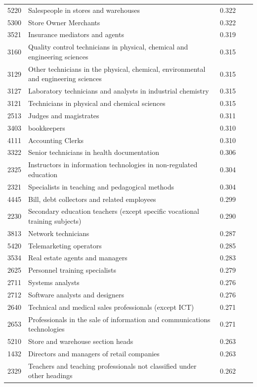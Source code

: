 \begin{longtable}{p{}>{\raggedright\arraybackslash}p{}rrr}
5220 & Salespeople in stores and warehouses & 0.322 & & \\
5300 & Store Owner Merchants & 0.322 & & \\
3521 & Insurance mediators and agents & 0.319 & & \\
3160 & Quality control technicians in physical, chemical and engineering sciences & 0.315 & & \\
3129 & Other technicians in the physical, chemical, environmental and engineering sciences & 0.315 & & \\
3127 & Laboratory technicians and analysts in industrial chemistry & 0.315 & & \\
3121 & Technicians in physical and chemical sciences & 0.315 & & \\
2513 & Judges and magistrates & 0.311 & & \\
3403 & bookkeepers & 0.310 & & \\
4111 & Accounting Clerks & 0.310 & & \\
3322 & Senior technicians in health documentation & 0.306 & & \\
2325 & Instructors in information technologies in non-regulated education & 0.304 & & \\
2321 & Specialists in teaching and pedagogical methods & 0.304 & & \\
4445 & Bill, debt collectors and related employees & 0.299 & & \\
2230 & Secondary education teachers (except specific vocational training subjects) & 0.290 & & \\
3813 & Network technicians & 0.287 & & \\
5420 & Telemarketing operators & 0.285 & & \\
3534 & Real estate agents and managers & 0.283 & & \\
2625 & Personnel training specialists & 0.279 & & \\
2711 & Systems analysts & 0.276 & & \\
2712 & Software analysts and designers & 0.276 & & \\
2640 & Technical and medical sales professionals (except ICT) & 0.271 & & \\
2653 & Professionals in the sale of information and communications technologies & 0.271 & & \\
5210 & Store and warehouse section heads & 0.263 & & \\
1432 & Directors and managers of retail companies & 0.263 & & \\
2329 & Teachers and teaching professionals not classified under other headings & 0.262 & & \\

\end{longtable}
